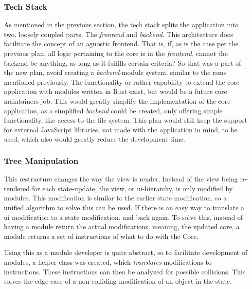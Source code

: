 \subsubsection{Tech Stack}

As mentioned in the previous section, the tech stack splits the application into
two, loosely coupled parts. The \textit{frontend} and \textit{backend}. This
architecture does facilitate the concept of an agnostic frontend. That is, if,
as is the case per the previous plan, all logic pertaining to the core is in the
\textit{frontend}, cannot the backend be anything, as long as it fulfills
certain criteria?
So that was a part of the new plan, avoid creating a \textit{backend}-module
system, similar to the \gls{rsms} mentioned previously. The functionality or
rather capability to extend the core application with modules written in Rust
exist, but would be a future core maintainers job. This would greatly simplify
the implementation of the core application, as a simplified \textit{backend}
could be created, only offering simple functionality, like access to the file
system. This plan would still keep the support for external JavaScript
libraries, not made with the application in mind, to be used, which also would
greatly reduce the development time.

\subsubsection{Tree Manipulation}


This restructure changes the way the view is render. Instead of the view being
re-rendered for each state-update, the view, or \gls{ui}-hierarchy, is only
modified by modules. This modification is similar to the earlier state
modification, so a unified algorithm to solve this can be used. If there is an
easy way to translate a \gls{ui} modification to a state modification, and back
again. To solve this, instead of having a module return the actual
modifications, meaning, the updated core, a module returns a set of instructions
of what to do with the Core.

Using this as a module developer is quite abstract, so to facilitate development
of modules, a helper class was created, which \textit{translates} modifications
to instructions. These instructions can then be analyzed for possible
collisions. This solves the edge-case of a non-colliding modification of an
object in the state.

